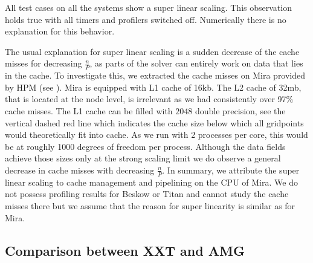 \documentclass{sig-alternate}
\begin{document}
All test cases on all the systems show a super linear scaling. This
observation holds true with all timers and profilers switched off.
Numerically there is no explanation for this behavior. 

The usual explanation for super linear scaling is a sudden decrease of the cache
misses for decreasing $\frac{n}{P}$, as parts of the solver can entirely work on
data that lies in the cache. 
To investigate this, we extracted the cache misses on Mira provided by HPM (see
). Mira is equipped with L1 cache of 16kb. The L2 cache
of 32mb, that is located at the node level, is irrelevant as we had consistently
over 97\% cache misses. The L1 cache can be filled with $2048$ double precision, see
 the vertical dashed red line which indicates the cache 
size below which all gridpoints would theoretically fit into cache. As we run with 2 processes per core, this would be at roughly 1000
degrees of freedom per process. Although the data fields achieve those sizes only at the strong scaling
limit we do observe a general decrease in cache misses with decreasing
$\frac{n}{P}$. In summary, we attribute the super linear scaling to cache
management and pipelining on the CPU of Mira. We do not possess profiling results 
for Beskow or Titan and cannot study the cache misses there but we assume that the 
reason for super linearity is similar as for Mira.


\subsection{Comparison between XXT and AMG}
\end{document}
